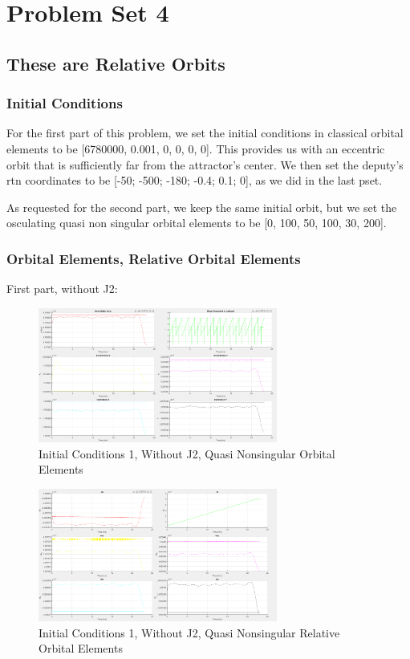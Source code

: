 \section{Problem Set 4}

\subsection{These are Relative Orbits}

\subsubsection{Initial Conditions}
For the first part of this problem, we set the initial conditions in classical orbital elements to be [6780000, 0.001, 0, 0, 0, 0]. This provides us with an eccentric orbit that is sufficiently far from the attractor's center. We then set the deputy's rtn coordinates to be [-50; -500; -180; -0.4; 0.1; 0], as we did in the last pset.

As requested for the second part, we keep the same initial orbit, but we set the osculating quasi non singular orbital elements to be [0, 100, 50, 100, 30, 200].

\subsubsection{Orbital Elements, Relative Orbital Elements}
First part, without J2:
\begin{figure}[H]
    \centering
    \includegraphics[width=0.7\textwidth]{PS4/Figures/case1_noJ2.png}
    \caption{Initial Conditions 1, Without J2, Quasi Nonsingular Orbital Elements}
    \label{fig:hcw_velocity}
\end{figure}
\begin{figure}[H]
    \centering
    \includegraphics[width=0.7\textwidth]{PS4/Figures/case1_noJ2_2.png}
    \caption{Initial Conditions 1, Without J2, Quasi Nonsingular Relative Orbital Elements}
    \label{fig:hcw_velocity}
\end{figure}


